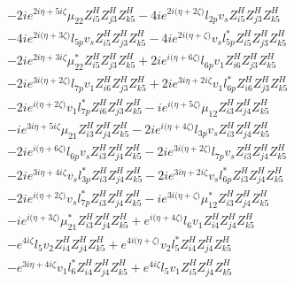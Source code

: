 \begin{align}
 &-2 i e^{2 i \eta +5 i \zeta } \mu_{22} Z_{{i 5}}^{H} Z_{{j 3}}^{H} Z_{{k 5}}^{H} -4 i e^{2 i \Big(\eta +2 \zeta \Big)} l_{2p} v_s Z_{{i 5}}^{H} Z_{{j 3}}^{H} Z_{{k 5}}^{H} \nonumber \\ 
 &-4 i e^{2 i \Big(\eta +3 \zeta \Big)} l_{5p} v_s Z_{{i 5}}^{H} Z_{{j 3}}^{H} Z_{{k 5}}^{H} -4 i e^{2 i \Big(\eta +\zeta \Big)} v_s l_{5p}^* Z_{{i 5}}^{H} Z_{{j 3}}^{H} Z_{{k 5}}^{H} \nonumber \\ 
 &-2 i e^{2 i \eta +3 i \zeta } \mu_{22}^* Z_{{i 5}}^{H} Z_{{j 3}}^{H} Z_{{k 5}}^{H} +2 i e^{i \Big(\eta +6 \zeta \Big)} l_{6p} v_1 Z_{{i 6}}^{H} Z_{{j 3}}^{H} Z_{{k 5}}^{H} \nonumber \\ 
 &-2 i e^{3 i \Big(\eta +2 \zeta \Big)} l_{7p} v_1 Z_{{i 6}}^{H} Z_{{j 3}}^{H} Z_{{k 5}}^{H} +2 i e^{3 i \eta +2 i \zeta } v_1 l_{6p}^* Z_{{i 6}}^{H} Z_{{j 3}}^{H} Z_{{k 5}}^{H} \nonumber \\ 
 &-2 i e^{i \Big(\eta +2 \zeta \Big)} v_1 l_{7p}^* Z_{{i 6}}^{H} Z_{{j 3}}^{H} Z_{{k 5}}^{H} -i e^{i \Big(\eta +5 \zeta \Big)} \mu_{12} Z_{{i 3}}^{H} Z_{{j 4}}^{H} Z_{{k 5}}^{H} \nonumber \\ 
 &-i e^{3 i \eta +5 i \zeta } \mu_{21} Z_{{i 3}}^{H} Z_{{j 4}}^{H} Z_{{k 5}}^{H} -2 i e^{i \Big(\eta +4 \zeta \Big)} l_{3p} v_s Z_{{i 3}}^{H} Z_{{j 4}}^{H} Z_{{k 5}}^{H} \nonumber \\ 
 &-2 i e^{i \Big(\eta +6 \zeta \Big)} l_{6p} v_s Z_{{i 3}}^{H} Z_{{j 4}}^{H} Z_{{k 5}}^{H} -2 i e^{3 i \Big(\eta +2 \zeta \Big)} l_{7p} v_s Z_{{i 3}}^{H} Z_{{j 4}}^{H} Z_{{k 5}}^{H} \nonumber \\ 
 &-2 i e^{3 i \eta +4 i \zeta } v_s l_{3p}^* Z_{{i 3}}^{H} Z_{{j 4}}^{H} Z_{{k 5}}^{H} -2 i e^{3 i \eta +2 i \zeta } v_s l_{6p}^* Z_{{i 3}}^{H} Z_{{j 4}}^{H} Z_{{k 5}}^{H} \nonumber \\ 
 &-2 i e^{i \Big(\eta +2 \zeta \Big)} v_s l_{7p}^* Z_{{i 3}}^{H} Z_{{j 4}}^{H} Z_{{k 5}}^{H} -i e^{3 i \Big(\eta +\zeta \Big)} \mu_{12}^* Z_{{i 3}}^{H} Z_{{j 4}}^{H} Z_{{k 5}}^{H} \nonumber \\ 
 &-i e^{i \Big(\eta +3 \zeta \Big)} \mu_{21}^* Z_{{i 3}}^{H} Z_{{j 4}}^{H} Z_{{k 5}}^{H} +e^{i \Big(\eta +4 \zeta \Big)} l_6 v_1 Z_{{i 4}}^{H} Z_{{j 4}}^{H} Z_{{k 5}}^{H} \nonumber \\ 
 &- e^{4 i \zeta } l_5 v_2 Z_{{i 4}}^{H} Z_{{j 4}}^{H} Z_{{k 5}}^{H} +e^{4 i \Big(\eta +\zeta \Big)} v_2 l_5^* Z_{{i 4}}^{H} Z_{{j 4}}^{H} Z_{{k 5}}^{H} \nonumber \\ 
 &- e^{3 i \eta +4 i \zeta } v_1 l_6^* Z_{{i 4}}^{H} Z_{{j 4}}^{H} Z_{{k 5}}^{H} +e^{4 i \zeta } l_5 v_1 Z_{{i 5}}^{H} Z_{{j 4}}^{H} Z_{{k 5}}^{H} \nonumber \\ 

\end{align}
